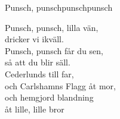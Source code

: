 \begin{song}{Punsch, punsch}{punschpunsch}
\begin{vers}
Punsch, punsch, lilla vän,\\
dricker vi ikväll.\\
Punsch, punsch får du sen,\\
så att du blir säll.\\
Cederlunds till far,\\
och Carlshamns Flagg åt mor,\\
och hemgjord blandning\\
åt lille, lille bror\\
\end{vers}
\end{song}
